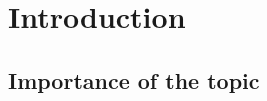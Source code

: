 \chapter{Introduction}
\label{chapter-introduction} 
\newcommand{\keyword}[1]{\textbf{#1}}
\newcommand{\tabhead}[1]{\textbf{#1}}
\newcommand{\code}[1]{\texttt{#1}}
\newcommand{\file}[1]{\texttt{\bfseries#1}}
\newcommand{\option}[1]{\texttt{\itshape#1}}
\section{Importance of the topic}


